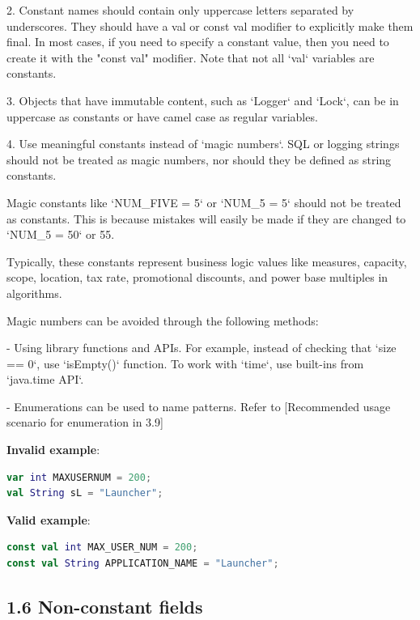 2. Constant names should contain only uppercase letters separated by underscores. They should have a val or const val modifier to explicitly make them final. In most cases, if you need to specify a constant value, then you need to create it with the "const val" modifier. Note that not all `val` variables are constants.



3. Objects that have immutable content, such as `Logger` and `Lock`, can be in uppercase as constants or have camel case as regular variables.



4. Use meaningful constants instead of `magic numbers`. SQL or logging strings should not be treated as magic numbers, nor should they be defined as string constants.

Magic constants like `NUM\_FIVE = 5` or `NUM\_5 = 5` should not be treated as constants. This is because mistakes will easily be made if they are changed to `NUM\_5 = 50` or 55.

Typically, these constants represent business logic values like measures, capacity, scope, location, tax rate, promotional discounts, and power base multiples in algorithms. 

Magic numbers can be avoided through the following methods:

- Using library functions and APIs. For example, instead of checking that `size == 0`, use `isEmpty()` function. To work with `time`, use built-ins from `java.time API`.

- Enumerations can be used to name patterns. Refer to [Recommended usage scenario for enumeration in 3.9]



\textbf{Invalid example}: 



\begin{lstlisting}[language=Kotlin]
var int MAXUSERNUM = 200;
val String sL = "Launcher";
\end{lstlisting}


\textbf{Valid example}:



\begin{lstlisting}[language=Kotlin]
const val int MAX_USER_NUM = 200;
const val String APPLICATION_NAME = "Launcher";
\end{lstlisting}


\subsection*{\textbf{1.6 Non-constant fields}}


